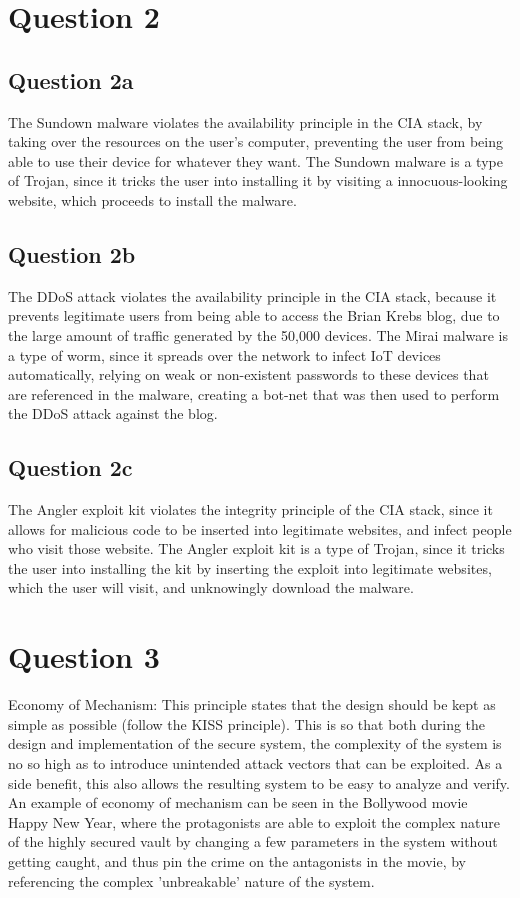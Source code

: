 \documentclass[12pt,a4paper]{article}
\begin{document}
\section{Question 2}
\subsection{Question 2a}
The Sundown malware violates the availability principle in the CIA stack, by taking over the resources on the user's computer, preventing the user from being able to use their device for whatever they want. The Sundown malware is a type of Trojan, since it tricks the user into installing it by visiting a innocuous-looking website, which proceeds to install the malware. 

\subsection{Question 2b}
The DDoS attack violates the availability principle in the CIA stack, because it prevents legitimate users from being able to access the Brian Krebs blog, due to the large amount of traffic generated by the 50,000 devices. The Mirai malware is a type of worm, since it spreads over the network to infect IoT devices automatically, relying on weak or non-existent passwords to these devices that are referenced in the malware, creating a bot-net that was then used to perform the DDoS attack against the blog.

\subsection{Question 2c}
The Angler exploit kit violates the integrity principle of the CIA stack, since it allows for malicious code to be inserted into legitimate websites, and infect people who visit those website. The Angler exploit kit is a type of Trojan, since it tricks the user into installing the kit by inserting the exploit into legitimate websites, which the user will visit, and unknowingly download the malware.

\section{Question 3}
Economy of Mechanism: This principle states that the design should be kept as simple as possible (follow the KISS principle). This is so that both during the design and implementation of the secure system, the complexity of the system is no so high as to introduce unintended attack vectors that can be exploited. As a side benefit, this also allows the resulting system to be easy to analyze and verify. An example of economy of mechanism can be seen in the Bollywood movie Happy New Year, where the protagonists are able to exploit the complex nature of the highly secured vault by changing a few parameters in the system without getting caught, and thus pin the crime on the antagonists in the movie, by referencing the complex 'unbreakable' nature of the system.\\
\end{document}
